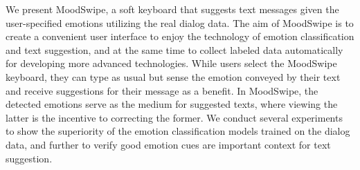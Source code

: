 We present MoodSwipe, a soft keyboard that suggests text messages given the user-specified emotions utilizing the real dialog data. The aim of MoodSwipe is to create a convenient user interface to enjoy the technology of emotion classification and text suggestion, and at the same time to collect labeled data automatically for developing more advanced technologies. While users select the MoodSwipe keyboard, they can type as usual but sense the emotion conveyed by their text and receive suggestions for their message as a benefit. In MoodSwipe, the detected emotions serve as the medium for suggested texts, where viewing the latter is the incentive to correcting the former. We conduct several experiments to show the superiority of the emotion classification models trained on the dialog data, and further to verify good emotion cues are important context for text suggestion.
